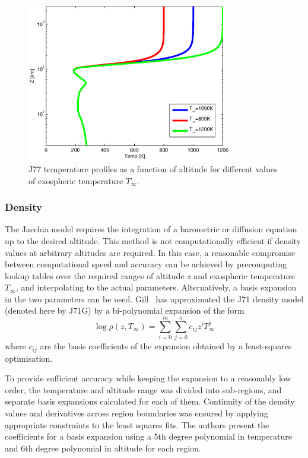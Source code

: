 \documentclass[Orbiter Technical Reference.tex]{subfiles}
\begin{document}
\begin{figure}
\includegraphics[width=0.8\textwidth]{jacchia_temp.eps}
\caption{J77 temperature profiles as a function of altitude for different values of exospheric temperature $T_\infty$.}
\label{fig:jacchia_temp}
\end{figure}

\subsubsection{Density}

The Jacchia model requires the integration of a barometric or diffusion equation up to the desired altitude. This method is not computationally efficient if density values at arbitrary altitudes are required. In this case, a reasonable compromise between computational speed and accuracy can be achieved by precomputing lookup tables over the required ranges of altitude $z$ and exospheric temperature $T_\infty$, and interpolating to the actual parameters. Alternatively, a basis expansion in the two parameters can be used. Gill~\cite{gill96} has approximated the J71 density model (denoted here by J71G) by a bi-polynomial expansion of the form
\begin{equation}\label{eq:interpol}
\log \rho(z,T_\infty) = \sum_{i=0}^m \sum_{j=0}^n c_{ij} z^i T_\infty^j
\end{equation}
where $c_{ij}$ are the basis coefficients of the expansion obtained by a least-squares optimisation.

To provide sufficient accuracy while keeping the expansion to a reasonably low order, the temperature and altitude range was divided into sub-regions, and separate basis expansions calculated for each of them. Continuity of the density values and derivatives across region boundaries was ensured by applying appropriate constraints to the least squares fits. The authors present the coefficients for a basis expansion using a 5th degree polynomial in temperature and 6th degree polynomial in altitude for each region.
\end{document}
